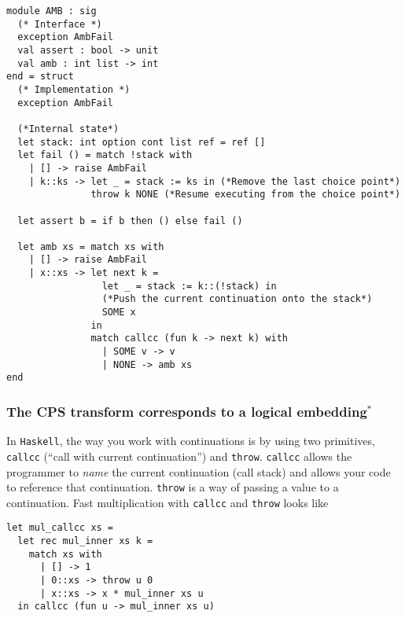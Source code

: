 \begin{code}
\label{code:amb-specification}
\begin{verbatim}
module AMB : sig
  (* Interface *)
  exception AmbFail
  val assert : bool -> unit
  val amb : int list -> int
end = struct
  (* Implementation *)
  exception AmbFail

  (*Internal state*)
  let stack: int option cont list ref = ref []
  let fail () = match !stack with
    | [] -> raise AmbFail
    | k::ks -> let _ = stack := ks in (*Remove the last choice point*)
               throw k NONE (*Resume executing from the choice point*)
  
  let assert b = if b then () else fail ()

  let amb xs = match xs with
    | [] -> raise AmbFail
    | x::xs -> let next k = 
                 let _ = stack := k::(!stack) in 
                 (*Push the current continuation onto the stack*)
                 SOME x
               in
               match callcc (fun k -> next k) with
                 | SOME v -> v 
                 | NONE -> amb xs 
end
\end{verbatim}
\end{code}

\subsubsection{The CPS transform corresponds to a logical embedding$^{*}$}
In \texttt{Haskell}, the way you work with continuations is by using two primitives, \texttt{callcc} (``call with current continuation'') and \texttt{throw}. \texttt{callcc} allows the programmer to \emph{name} the current continuation (call stack) and allows your code to reference that continuation. \texttt{throw} is a way of passing a value to a continuation. Fast multiplication with \texttt{callcc} and \texttt{throw} looks like

\begin{code}
\label{code:mul-ocaml-callcc}
\begin{verbatim}
let mul_callcc xs = 
  let rec mul_inner xs k = 
    match xs with
      | [] -> 1
      | 0::xs -> throw u 0
      | x::xs -> x * mul_inner xs u
  in callcc (fun u -> mul_inner xs u)
\end{verbatim}
\end{code}

